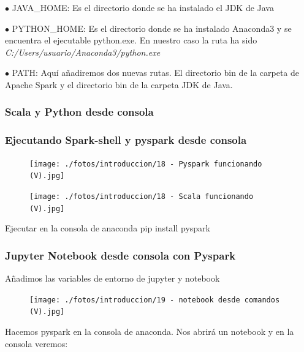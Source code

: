 \documentclass[a4paper,10pt]{article}
\begin{document}
$\bullet$ JAVA\_HOME: Es el directorio donde se ha instalado el JDK de Java

$\bullet$ PYTHON\_HOME: Es el directorio donde se ha instalado Anaconda3 y se encuentra el ejecutable python.exe. En nuestro caso la ruta ha sido \textit{C:/Users/usuario/Anaconda3/python.exe}

$\bullet$ PATH: Aquí añadiremos dos nuevas rutas. El directorio bin de la carpeta de Apache Spark y el directorio bin de la carpeta JDK de Java. 

\subsubsection{Scala y Python desde consola}

\subsubsection{Ejecutando Spark-shell y pyspark desde consola}

\begin{figure}[H]
\begin{center}
\texttt{[image: ./fotos/introduccion/18 - Pyspark funcionando (V).jpg]}
\end{center}
\end{figure}

\begin{figure}[H]
\begin{center}
\texttt{[image: ./fotos/introduccion/18 - Scala funcionando (V).jpg]}
\end{center}
\end{figure}

Ejecutar en la consola de anaconda pip install pyspark 

\subsubsection{Jupyter Notebook desde consola con Pyspark}

Añadimos las variables de entorno de jupyter y notebook 

\begin{figure}[H]
\begin{center}
\texttt{[image: ./fotos/introduccion/19 - notebook desde comandos (V).jpg]}
\end{center}
\end{figure}

Hacemos pyspark en la consola de anaconda. Nos abrirá un notebook y en la consola veremos:
\end{document}

